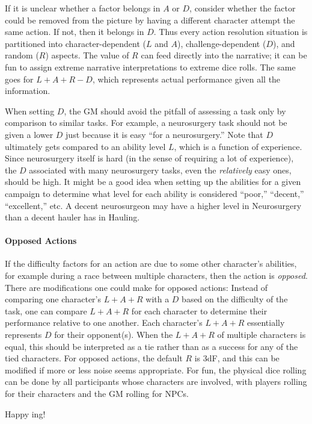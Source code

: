 If it is unclear whether a factor belongs in $A$ or $D$, consider whether the factor could be removed from the picture by having a different character attempt the same action. If not, then it belongs in $D$.
Thus every action resolution situation is partitioned into
character-dependent ($L$ and $A$), challenge-dependent ($D$), and random ($R$) aspects.
The value of $R$ can feed directly into the narrative; it can be fun to assign extreme narrative interpretations to extreme dice rolls.
The same goes for $L + A + R - D$, which represents actual performance given all the information.


When setting $D$, the GM should avoid the pitfall of assessing a task only by comparison to similar tasks.
For example, a neurosurgery task should not be given a lower $D$ just because it is easy ``for a neurosurgery.''
Note that $D$ ultimately gets compared to an ability level $L$, which is a function of experience.
Since neurosurgery itself is hard (in the sense of requiring a lot of experience), the $D$ associated with many neurosurgery tasks, even the \emph{relatively} easy ones, should be high.
It might be a good idea when setting up the abilities for a given campaign to determine what level for each ability is considered ``poor,'' ``decent,'' ``excellent,'' etc.
A decent neurosurgeon may have a higher level in Neurosurgery than a decent hauler has in Hauling.

\paragraph{Opposed Actions}
If the difficulty factors for an action are due to some other character’s abilities, for example during a race between multiple characters, then the action is \emph{opposed}. There are modifications one could make for opposed actions: Instead of comparing one character’s $L + A + R$ with a $D$ based on the difficulty of the task, one can compare $L + A + R$ for each character to determine their performance relative to one another. Each character's $L + A + R$ essentially represents $D$ for their opponent(s). When the $L + A + R$ of multiple characters is equal, this should be interpreted as a tie rather than as a success for any of the tied characters. For opposed actions, the default $R$ is $3$dF, and this can be modified if more or less noise seems appropriate. For fun, the physical dice rolling can be done by all participants whose characters are involved, with players rolling for their characters and the GM rolling for NPCs.

Happy \peupfudge{}ing!

